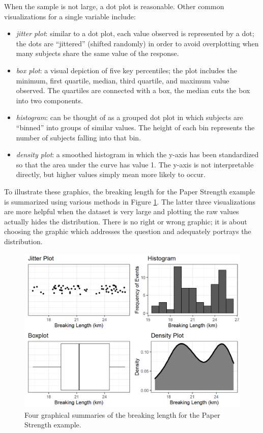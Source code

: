 \documentclass[
]{book}
\providecommand{\tightlist}{%
  \setlength{\itemsep}{0pt}\setlength{\parskip}{0pt}}
\theoremstyle{plain}
\theoremstyle{mydefn}
\theoremstyle{myexmpl}
\theoremstyle{remark}
\begin{document}
When the sample is not large, a dot plot is reasonable. Other common visualizations for a single variable include:

\begin{itemize}
\tightlist
\item
  \emph{jitter plot}: similar to a dot plot, each value observed is represented by a dot; the dots are ``jittered'' (shifted randomly) in order to avoid overplotting when many subjects share the same value of the response.
\item
  \emph{box plot}: a visual depiction of five key percentiles; the plot includes the minimum, first quartile, median, third quartile, and maximum value observed. The quartiles are connected with a box, the median cuts the box into two components.
\item
  \emph{histogram}: can be thought of as a grouped dot plot in which subjects are ``binned'' into groups of similar values. The height of each bin represents the number of subjects falling into that bin.
\item
  \emph{density plot}: a smoothed histogram in which the y-axis has been standardized so that the area under the curve has value 1. The y-axis is not interpretable directly, but higher values simply mean more likely to occur.
\end{itemize}

To illustrate these graphics, the breaking length for the Paper Strength example is summarized using various methods in Figure \ref{fig:summaries-univariate}. The latter three visualizations are more helpful when the dataset is very large and plotting the raw values actually hides the distribution. There is no right or wrong graphic; it is about choosing the graphic which addresses the question and adequately portrays the distribution.

\begin{figure}

{\centering \includegraphics[width=0.8\linewidth]{./Images/summaries-univariate-1} 

}

\caption{Four graphical summaries of the breaking length for the Paper Strength example.}\label{fig:summaries-univariate}
\end{figure}
\end{document}
